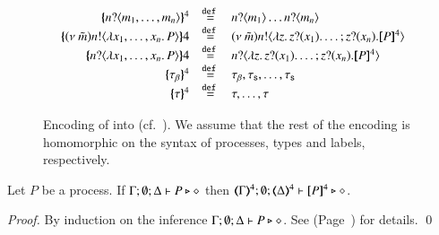 \begin{figure}[t]
\[\begin{array}{rcl}
			\mapa{\bactinp{n}{m_1, \dots, m_n}}^{4} &\defeq& \bactinp{n}{m_1} \dots \bactinp{n}{m_n}
			\\
			\mapa{\news{\tilde{m}} \bactout{n}{\abs{x_1, \dots, x_n}{P}}}{4} &\defeq& \news{\tilde{m}} \bactout{n}{\abs{z}{\binp{z}{x_1} \dots; \binp{z}{x_n} \pmap{P}{4}}}
			\\
			\mapa{\bactinp{n}{\abs{x_1, \dots, x_n}{P}}}{4} &\defeq& \bactinp{n}{\abs{z}{\binp{z}{x_1} \dots; \binp{z}{x_n} \pmap{P}{4}}}
			\\
			\mapa{\btau}^{4} &\defeq& \btau, \stau, \dots, \stau
			\\
			\mapa{\tau}^{4} &\defeq& \tau, \dots, \tau
		\end{array}
	\]
%
	\caption{Encoding of \pHOp into \HOp (cf.~).
	We assume that the rest of the encoding is homomorphic on the syntax of
	processes, types and labels, respectively. \label{fig:enc:pHOp_to_HOp}}
\end{figure}

\begin{proposition}\rm
	\label{prop:typepres_pHOp_to_HOp}
	Let $P$ be a \pHOp process.
	If $\Gamma; \emptyset; \Delta \vdash P \triangleright \diamond$ then 
	$\tmap{\Gamma}{4}; \emptyset; \tmap{\Delta}{4} \proves \pmap{P}{4} \hastype \Proc$. 
\end{proposition}

\begin{proof}
	By induction on the inference $\Gamma; \emptyset; \Delta \vdash P \triangleright \diamond$.
	See  (Page~\pageref{app:prop:typepres_pHOp_to_HOp}) for details.
	\qed
\end{proof}


